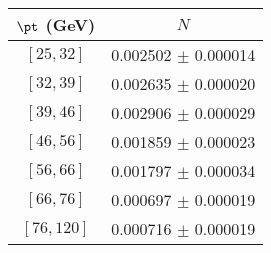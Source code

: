 \begin{tabular}{c||c}
$\pt$ (GeV) & $N$  \\
\hline
$[25, 32]$ & 0.002502 $\pm$ 0.000014\\
$[32, 39]$ & 0.002635 $\pm$ 0.000020\\
$[39, 46]$ & 0.002906 $\pm$ 0.000029\\
$[46, 56]$ & 0.001859 $\pm$ 0.000023\\
$[56, 66]$ & 0.001797 $\pm$ 0.000034\\
$[66, 76]$ & 0.000697 $\pm$ 0.000019\\
$[76, 120]$ & 0.000716 $\pm$ 0.000019\\
\end{tabular}
